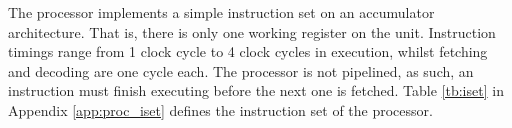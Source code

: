 The processor implements a simple instruction set on an accumulator
architecture. That is, there is only one working register on the unit.
Instruction timings range from 1 clock cycle to 4 clock cycles in execution,
whilst fetching and decoding are one cycle each. The processor is not
pipelined, as such, an instruction must finish executing before the next one is
fetched. Table \ref{tb:iset} in Appendix \ref{app:proc_iset} defines the
instruction set of the processor.

